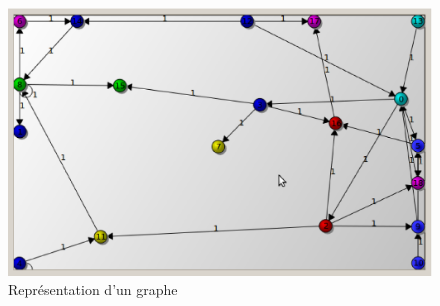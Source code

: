 \documentclass[11pt,a4paper]{article}
\begin{document}
			\begin{figure}[htbp]
				\begin{center}
					\includegraphics[width=\linewidth]{graph.eps}
				\end{center}
				\caption{Représentation d'un graphe}
				\label{img_graphe}
			\end{figure}
			
		\newpage
\end{document}
